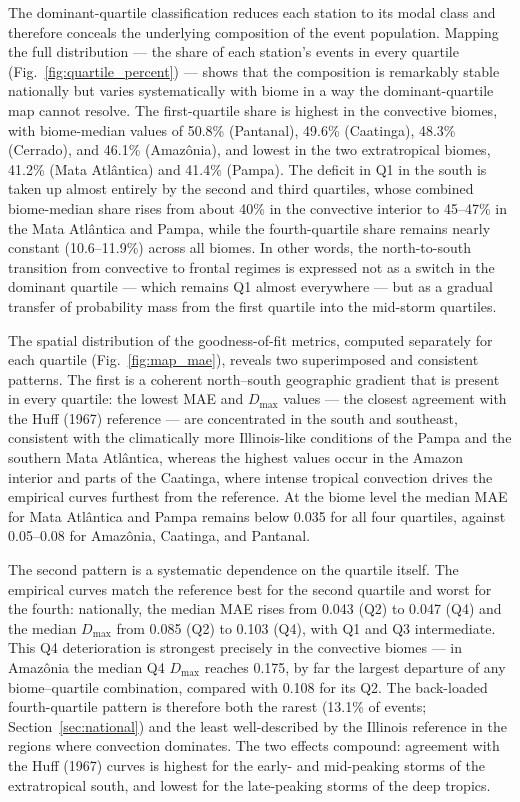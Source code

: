\documentclass[a4paper,fleqn]{cas-sc}
\begin{document}
The dominant-quartile classification reduces each station to its modal
class and therefore conceals the underlying composition of the event
population. Mapping the full distribution — the share of each station's
events in every quartile (Fig.~\ref{fig:quartile_percent}) — shows that
the composition is remarkably stable nationally but varies
systematically with biome in a way the dominant-quartile map cannot
resolve. The first-quartile share is highest in the convective biomes,
with biome-median values of 50.8\% (Pantanal), 49.6\% (Caatinga),
48.3\% (Cerrado), and 46.1\% (Amazônia), and lowest in the two
extratropical biomes, 41.2\% (Mata Atlântica) and 41.4\% (Pampa).
The deficit in Q1 in the south is taken up almost entirely by the
second and third quartiles, whose combined biome-median share rises
from about 40\% in the convective interior to 45–47\% in the Mata
Atlântica and Pampa, while the fourth-quartile share remains nearly
constant (10.6–11.9\%) across all biomes. In other words, the
north-to-south transition from convective to frontal regimes is
expressed not as a switch in the dominant quartile — which remains Q1
almost everywhere — but as a gradual transfer of probability mass from
the first quartile into the mid-storm quartiles.

The spatial distribution of the goodness-of-fit metrics, computed
separately for each quartile (Fig.~\ref{fig:map_mae}), reveals two
superimposed and consistent patterns. The first is a coherent
north–south geographic gradient that is present in every quartile: the
lowest MAE and $D_\mathrm{max}$ values — the closest agreement with the
Huff (1967) reference — are concentrated in the south and southeast,
consistent with the climatically more Illinois-like conditions of the
Pampa and the southern Mata Atlântica, whereas the highest values occur
in the Amazon interior and parts of the Caatinga, where intense
tropical convection drives the empirical curves furthest from the
reference. At the biome level the median MAE for Mata Atlântica and
Pampa remains below 0.035 for all four quartiles, against 0.05–0.08 for
Amazônia, Caatinga, and Pantanal.

The second pattern is a systematic dependence on the quartile itself.
The empirical curves match the reference best for the second quartile
and worst for the fourth: nationally, the median MAE rises from 0.043
(Q2) to 0.047 (Q4) and the median $D_\mathrm{max}$ from 0.085 (Q2) to
0.103 (Q4), with Q1 and Q3 intermediate. This Q4 deterioration is
strongest precisely in the convective biomes — in Amazônia the median
Q4 $D_\mathrm{max}$ reaches 0.175, by far the largest departure of any
biome–quartile combination, compared with 0.108 for its Q2. The
back-loaded fourth-quartile pattern is therefore both the rarest
(13.1\% of events; Section~\ref{sec:national}) and the least
well-described by the Illinois reference in the regions where
convection dominates. The two effects compound: agreement with the
Huff (1967) curves is highest for the early- and mid-peaking storms of
the extratropical south, and lowest for the late-peaking storms of the
deep tropics.
\end{document}

